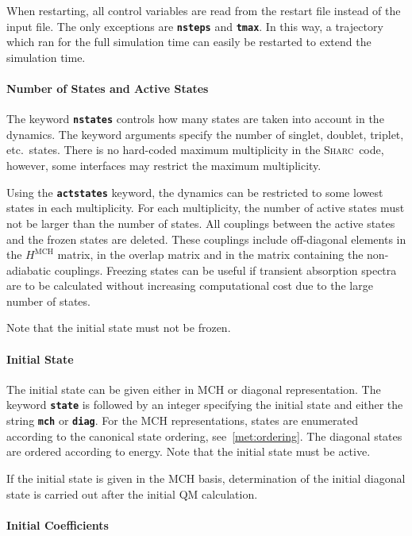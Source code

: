 \documentclass[a4paper,11pt,DIV=15,openany,twoside=false]{scrbook}
\newcommand{\sharc}{\textsc{Sharc}}
\newcommand{\ttt}[1]{\textbf{\texttt{#1}}}
\begin{document}
When restarting, all control variables are read from the restart file instead of the input file. The only exceptions are \ttt{nsteps} and \ttt{tmax}. In this way, a trajectory which ran for the full simulation time can easily be restarted to extend the simulation time.

\paragraph{Number of States and Active States}

The keyword \ttt{nstates} controls how many states are taken into account in the dynamics. The keyword arguments specify the number of singlet, doublet, triplet, etc.\ states. There is no hard-coded maximum multiplicity in the \sharc\ code, however, some interfaces may restrict the maximum multiplicity. 

Using the \ttt{actstates} keyword, the dynamics can be restricted to some lowest states in each multiplicity. For each multiplicity, the number of active states must not be larger than the number of states. All couplings between the active states and the frozen states are deleted. These couplings include off-diagonal elements in the $H^{\text{MCH}}$ matrix, in the overlap matrix and in the matrix containing the non-adiabatic couplings. Freezing states can be useful if transient absorption spectra are to be calculated without increasing computational cost due to the large number of states.

Note that the initial state must not be frozen.

\paragraph{Initial State}

The initial state can be given either in MCH or diagonal representation. The keyword \ttt{state} is followed by an integer specifying the initial state and either the string \ttt{mch} or \ttt{diag}. For the MCH representations, states are enumerated according to the canonical state ordering, see~\ref{met:ordering}. The diagonal states are ordered according to energy. Note that the initial state must be active. 

If the initial state is given in the MCH basis, determination of the initial diagonal state is carried out after the initial QM calculation.

\paragraph{Initial Coefficients}
\end{document}
